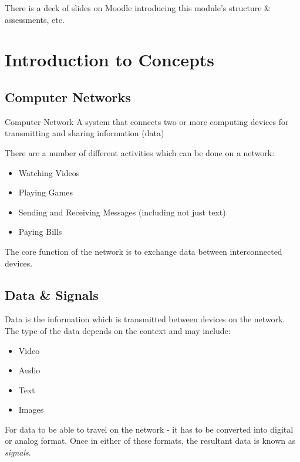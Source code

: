 
\begin{extlink}
There is a deck of slides on Moodle introducing this module's structure \& assessments, etc.
\end{extlink}

\section{Introduction to Concepts}

\subsection{Computer Networks}
\begin{define}
    \item[Computer Network] A system that connects two or more computing devices for transmitting and sharing information (data)
\end{define}

There are a number of different activities which can be done on a network:
\begin{itemize}
    \item Watching Videos
    \item Playing Games
    \item Sending and Receiving Messages (including not just text)
    \item Paying Bills
\end{itemize}

The core function of the network is to exchange data between interconnected devices.

\subsection{Data \& Signals}
Data is the information which is transmitted between devices on the network. The type of the data depends on the context and may include:
\begin{itemize}
    \item Video
    \item Audio
    \item Text
    \item Images
\end{itemize}

For data to be able to travel on the network - it has to be converted into digital or analog format. Once in either of these formats, the resultant data is known as \textit{signals}.

